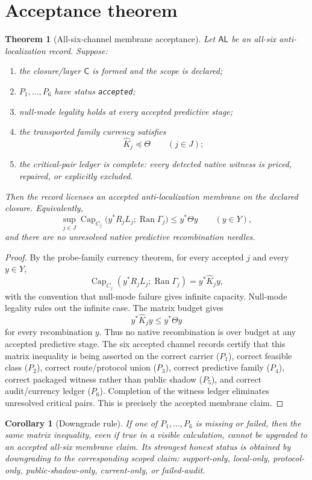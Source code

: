 \documentclass[11pt]{article}
\newtheorem{theorem}{Theorem}
\newtheorem{corollary}{Corollary}
\newcommand{\ThetaB}{\Theta}
\newcommand{\AL}{\mathsf{AL}}
\newcommand{\Ran}{\operatorname{Ran}}
\begin{document}
\section{Acceptance theorem}
\begin{theorem}[All-six-channel membrane acceptance]
Let $\AL$ be an all-six anti-localization record.  Suppose:
\begin{enumerate}[label=(\alph*)]
\item the closure/layer $\mathsf C$ is formed and the scope is declared;
\item $P_1,\dots,P_6$ have status \texttt{accepted};
\item null-mode legality holds at every accepted predictive stage;
\item the transported family currency satisfies
\[
  \widehat K_j\preceq \ThetaB\qquad(j\in J);
\]
\item the critical-pair ledger is complete: every detected native witness is priced, repaired, or explicitly excluded.
\end{enumerate}
Then the record licenses an accepted anti-localization membrane on the declared closure.  Equivalently,
\[
  \sup_{j\in J}\operatorname{Cap}_{C_j}\bigl(y^*R_jL_j;\Ran\Gamma_j\bigr)
  \le y^*\ThetaB y
  \qquad (y\in Y),
\]
and there are no unresolved native predictive recombination needles.
\end{theorem}

\begin{proof}
By the probe-family currency theorem, for every accepted $j$ and every $y\in Y$,
\[
  \operatorname{Cap}_{C_j}(y^*R_jL_j;\Ran\Gamma_j)=y^*\widehat K_jy,
\]
with the convention that null-mode failure gives infinite capacity.  Null-mode legality rules out the infinite case.  The matrix budget gives
\[
  y^*\widehat K_jy\le y^*\ThetaB y
\]
for every recombination $y$.  Thus no native recombination is over budget at any accepted predictive stage.  The six accepted channel records certify that this matrix inequality is being asserted on the correct carrier ($P_1$), correct feasible class ($P_2$), correct route/protocol union ($P_3$), correct predictive family ($P_4$), correct packaged witness rather than public shadow ($P_5$), and correct audit/currency ledger ($P_6$).  Completion of the witness ledger eliminates unresolved critical pairs.  This is precisely the accepted membrane claim.\end{proof}

\begin{corollary}[Downgrade rule]
If one of $P_1,\dots,P_6$ is missing or failed, then the same matrix inequality, even if true in a visible calculation, cannot be upgraded to an accepted all-six membrane claim.  Its strongest honest status is obtained by downgrading to the corresponding scoped claim: support-only, local-only, protocol-only, public-shadow-only, current-only, or failed-audit.
\end{corollary}
\end{document}
